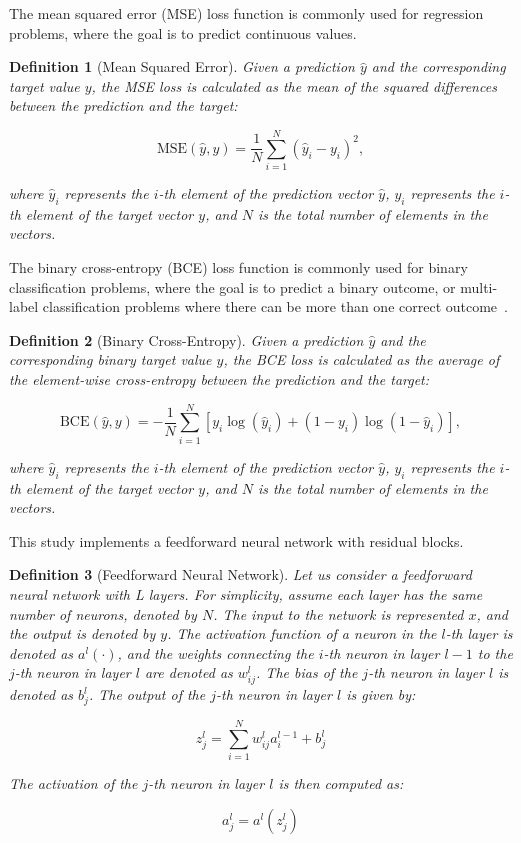 \documentclass[ppgc,diss,english]{iiufrgs}
\newtheorem{definition}{Definition}
\begin{document}
The mean squared error (MSE) loss function is commonly used for regression problems, where the goal is to predict continuous values.
\begin{definition}[Mean Squared Error]\label{def:mse}
Given a prediction $\hat{y}$ and the corresponding target value $y$, the MSE loss is calculated as the mean of the squared differences between the prediction and the target:

$$\text{MSE}(\hat{y}, y) = \frac{1}{N} \sum_{i=1}^{N} (\hat{y}_i - y_i)^2,$$

where $\hat{y}_i$ represents the $i$-th element of the prediction vector $\hat{y}$, $y_i$ represents the $i$-th element of the target vector $y$, and $N$ is the total number of elements in the vectors.
\end{definition}

The binary cross-entropy (BCE) loss function is commonly used for binary classification problems, where the goal is to predict a binary outcome, or multi-label classification problems where there can be more than one correct outcome~\cite{Tsoumakas.etal/2007}.
\begin{definition}[Binary Cross-Entropy]\label{def:mse}
Given a prediction $\hat{y}$ and the corresponding binary target value $y$, the BCE loss is calculated as the average of the element-wise cross-entropy between the prediction and the target:

$$\text{BCE}(\hat{y}, y) = -\frac{1}{N} \sum_{i=1}^{N} \left[y_i \log(\hat{y}_i) + (1 - y_i) \log(1 - \hat{y}_i)\right],$$

where $\hat{y}_i$ represents the $i$-th element of the prediction vector $\hat{y}$, $y_i$ represents the $i$-th element of the target vector $y$, and $N$ is the total number of elements in the vectors.
\end{definition}

This study implements a feedforward neural network with residual blocks.

\begin{definition}[Feedforward Neural Network]
Let us consider a feedforward neural network with L layers. For simplicity, assume each layer has the same number of neurons, denoted by $N$. The input to the network is represented $x$, and the output is denoted by $y$. The activation function of a neuron in the $l$-th layer is denoted as $a^l(\cdot)$, and the weights connecting the $i$-th neuron in layer $l-1$ to the $j$-th neuron in layer $l$ are denoted as $w^{l}_{ij}$. The bias of the $j$-th neuron in layer $l$ is denoted as $b^{l}_{j}$. The output of the $j$-th neuron in layer $l$ is given by:

$$z^{l}_{j} = \sum_{i=1}^{N} w^{l}_{ij} a^{l-1}_{i} + b^{l}_{j}$$

The activation of the $j$-th neuron in layer $l$ is then computed as:

$$a^{l}_{j} = a^{l}(z^{l}_{j})$$
\end{definition}
\end{document}
